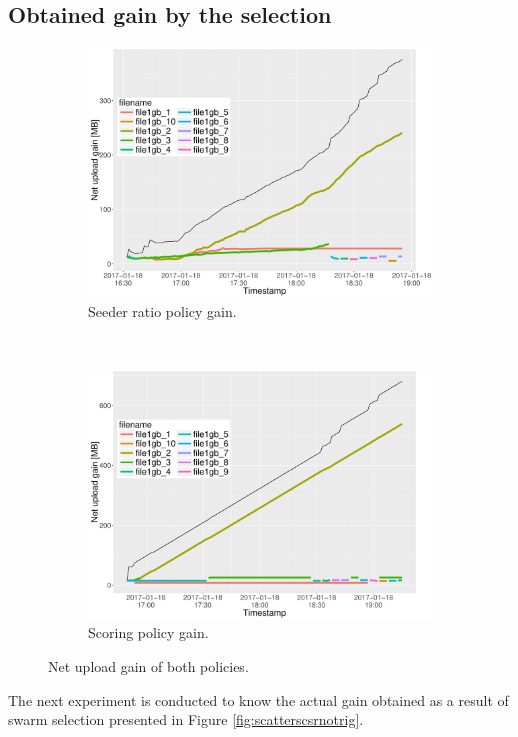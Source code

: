 \subsection{Obtained gain by the selection}
\label{section:resultgain}
\begin{figure}[b!]
	\begin{adjustwidth}{-1.5cm}{}
		\begin{subfigure}[t]{0.6\textwidth}
			\centering
			\includegraphics[width=\textwidth]{pics/results/simple1_sr_notrig.pdf}
			\caption{Seeder ratio policy gain.}
			\label{fig:simplesrnotrig}
		\end{subfigure}
		~
		\begin{subfigure}[t]{0.6\textwidth}
			\centering
			\includegraphics[width=\textwidth]{pics/results/simple1_scsr_notrig.pdf}
			\caption{Scoring policy gain.}
			\label{fig:simplescsrnotrig}
		\end{subfigure}
		\caption{Net upload gain of both policies.}
	\end{adjustwidth}
\end{figure} 
The next experiment is conducted to know the actual gain obtained as a result of swarm selection presented in Figure \ref{fig:scatterscsrnotrig}.

